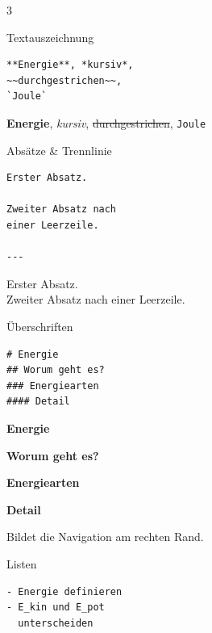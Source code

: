 \documentclass[a4paper,landscape,9pt]{extarticle}
\newcommand{\prevtxt}[1]{{\small #1}}
\begin{document}
\begin{multicols}{3}


\begin{mdcard}{Textauszeichnung}
\begin{lstlisting}[language=lia]
**Energie**, *kursiv*,
~~durchgestrichen~~,
`Joule`
\end{lstlisting}
\tcblower
\prevtxt{\textbf{Energie}, \textit{kursiv},
\sout{durchgestrichen}, \texttt{Joule}}
\end{mdcard}

\begin{mdcard}{Absätze \& Trennlinie}
\begin{lstlisting}[language=lia]
Erster Absatz.

Zweiter Absatz nach
einer Leerzeile.

---
\end{lstlisting}
\tcblower
\prevtxt{Erster Absatz.\\[3pt]
Zweiter Absatz nach einer Leerzeile.\\[2pt]
\textcolor{rulegray}{\hrulefill}}
\end{mdcard}

\begin{mdcard}{Überschriften}
\begin{lstlisting}[language=lia]
# Energie
## Worum geht es?
### Energiearten
#### Detail
\end{lstlisting}
\tcblower
{\large\bfseries Energie}\par\vspace{1pt}
{\normalsize\bfseries Worum geht es?}\par\vspace{1pt}
{\small\bfseries Energiearten}\par\vspace{1pt}
{\footnotesize\bfseries Detail}\par\vspace{2pt}
{\scriptsize\color{muted}Bildet die Navigation am rechten Rand.}
\end{mdcard}

\begin{mdcard}{Listen}
\begin{lstlisting}[language=lia]
- Energie definieren
- E_kin und E_pot
  unterscheiden


\end{lstlisting}
\end{mdcard}
\end{multicols}
\end{document}
